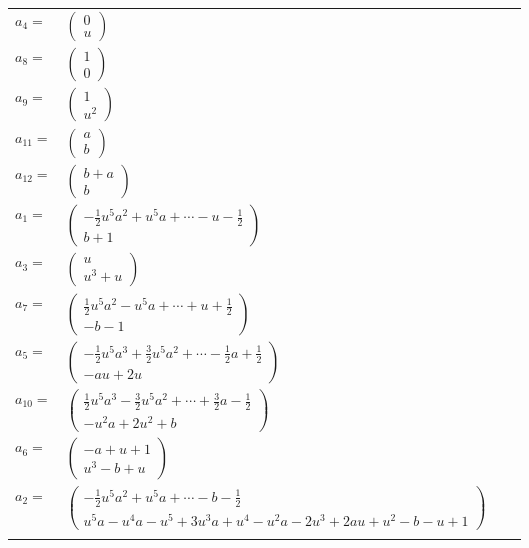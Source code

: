 \documentclass[1p]{elsarticle_modified}
\theoremstyle{definition}
\begin{document}
\begin{tabular}{m{7pt} m{180pt} m{7pt} m{180pt} }
\flushright $a_{4}=$&$\begin{pmatrix}0\\u\end{pmatrix}$ \\
\flushright $a_{8}=$&$\begin{pmatrix}1\\0\end{pmatrix}$ \\
\flushright $a_{9}=$&$\begin{pmatrix}1\\u^2\end{pmatrix}$ \\
\flushright $a_{11}=$&$\begin{pmatrix}a\\b\end{pmatrix}$ \\
\flushright $a_{12}=$&$\begin{pmatrix}b+a\\b\end{pmatrix}$ \\
\flushright $a_{1}=$&$\begin{pmatrix}-\frac{1}{2} u^5 a^2+u^5 a+\cdots- u-\frac{1}{2}\\b+1\end{pmatrix}$ \\
\flushright $a_{3}=$&$\begin{pmatrix}u\\u^3+u\end{pmatrix}$ \\
\flushright $a_{7}=$&$\begin{pmatrix}\frac{1}{2} u^5 a^2- u^5 a+\cdots+u+\frac{1}{2}\\- b-1\end{pmatrix}$ \\
\flushright $a_{5}=$&$\begin{pmatrix}-\frac{1}{2} u^5 a^3+\frac{3}{2} u^5 a^2+\cdots-\frac{1}{2} a+\frac{1}{2}\\- a u+2 u\end{pmatrix}$ \\
\flushright $a_{10}=$&$\begin{pmatrix}\frac{1}{2} u^5 a^3-\frac{3}{2} u^5 a^2+\cdots+\frac{3}{2} a-\frac{1}{2}\\- u^2 a+2 u^2+b\end{pmatrix}$ \\
\flushright $a_{6}=$&$\begin{pmatrix}- a+u+1\\u^3- b+u\end{pmatrix}$ \\
\flushright $a_{2}=$&$\begin{pmatrix}-\frac{1}{2} u^5 a^2+u^5 a+\cdots- b-\frac{1}{2}\\u^5 a- u^4 a- u^5+3 u^3 a+u^4- u^2 a-2 u^3+2 a u+u^2- b- u+1\end{pmatrix}$\\&\end{tabular}
\end{document}
